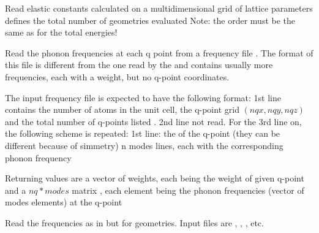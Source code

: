 \documentclass[letterpaper,10pt,english]{sphinxmanual}
\begin{document}

\begin{fulllineitems}
\label{pyqha:pyqha.read.read_elastic_constants_geo}
Read elastic constants calculated on a multidimensional grid of lattice parameters
 defines the total number of geometries evaluated
Note: the order must be the same as for the total energies!

\end{fulllineitems}


\begin{fulllineitems}
\label{pyqha:pyqha.read.read_freq}
Read the phonon frequencies at each q point from a frequency file .
The format of this file is different from the one read by the {\hyperref[pyqha:pyqha.read.read_freq]{}} and
contains usually more frequencies, each with a weight, but no q-point coordinates.

The input frequency file is expected to have the following format:
1st line contains the number of atoms in the unit cell, the q-point grid 
\((nqx, nqy, nqz)\) and the total number of q-points listed .
2nd line not read.   
For the 3rd line on, the following scheme is repeated:
1st line: the  of the q-point (they can be different because of simmetry)
n modes lines, each with the corresponding phonon frequency

Returning values are a  vector of weights, each  being the weight of given q-point 
and a \(nq*modes\) matrix , each element  being the phonon frequencies
(vector of modes elements) at the q-point 

\end{fulllineitems}


\begin{fulllineitems}
\label{pyqha:pyqha.read.read_freq_geo}
Read the frequencies as in {\hyperref[pyqha:pyqha.read.read_freq]{}} but for  geometries.
Input files are , , , etc.

\end{fulllineitems}
\end{document}

